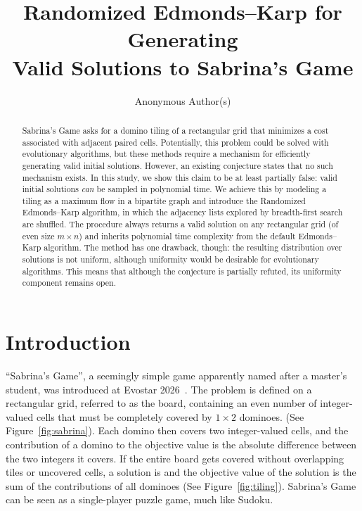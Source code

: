 \documentclass[svgnames,table,runningheads]{llncs}
\title{Randomized Edmonds--Karp for Generating \\Valid Solutions to Sabrina's Game}
\author{Anonymous Author(s)}
\institute{Anonymous institute(s)\\\email{anonymous@example.org}}
\begin{document}
\maketitle

\begin{abstract}
Sabrina's Game asks for a domino tiling of a rectangular grid that minimizes a cost associated with adjacent paired cells. Potentially, this problem could be solved with  evolutionary algorithms, but these methods  require a mechanism for efficiently generating valid initial solutions. However, an existing conjecture states that no such mechanism exists. In this study, we show this claim to be at least partially false: valid initial solutions \textit{can} be sampled in polynomial time. We achieve this by modeling a tiling as a maximum flow in a bipartite graph and introduce the Randomized Edmonds--Karp algorithm, in which the adjacency lists explored by breadth-first search are shuffled. The procedure always returns a valid solution on any rectangular grid (of even size \(m\times n\)) and inherits polynomial time complexity from the default Edmonds--Karp algorithm. The method has one drawback, though: the resulting distribution over solutions is not uniform, although uniformity would be desirable for evolutionary algorithms. This means that although the conjecture is partially refuted, its uniformity component remains open.

\end{abstract}

\section{Introduction}
``Sabrina's Game'', a seemingly simple game apparently named after a master's student, was introduced at Evostar 2026~\cite{SabrinasGame2026}. The problem is defined on a rectangular grid, referred to as the board, containing an even number of integer-valued cells that must be completely covered by \(1\times2\) dominoes. (See Figure~\ref{fig:sabrina}). Each domino then covers two integer-valued cells, and the contribution of a domino to the objective value is the absolute difference between the two integers it covers. If the entire board gets covered without overlapping tiles or uncovered cells, a solution is  and the objective value of the solution is the sum of the contributions of all dominoes (See Figure~\ref{fig:tiling}). Sabrina's Game can be seen as a single-player puzzle game, much like Sudoku.
\end{document}
